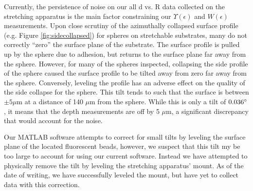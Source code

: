 Currently, the persistence of noise on our all d vs. R data collected on the stretching apparatus is the main factor constraining our $ \Upsilon(\epsilon) $ and $ W(\epsilon) $ measurements. Upon close scrutiny of the azimuthally collapsed surface profile (e.g. Figure \ref{fig:sidecollapsed}) for spheres on stretchable substrates, many do not correctly ``zero'' the surface plane of the substrate. The surface profile is pulled up by the sphere due to adhesion, but returns to the surface plane far away from the sphere. However, for many of the spheres inspected, collapsing the side profile of the sphere caused the surface profile to be tilted away from zero far away from the sphere. Conversely, leveling the profile has an adverse effect on the quality of the side collapse for the sphere. This tilt tends to such that the surface is between $ \pm 5 \mu$m at a distance of 140 $ \mu $m from the sphere. While this is only a tilt of $ 0.036 \degree $, it means that the depth measurements are off by 5 $ \mu $m, a significant discrepancy that would account for the noise.

Our MATLAB software attempts to correct for small tilts by leveling the surface plane of the located fluorescent beads, however, we suspect that this tilt my be too large to account for using our current software. Instead we have attempted to physically remove the tilt by leveling the stretching apparatus' mount. As of the date of writing, we have successfully leveled the mount, but have yet to collect data with this correction. 
